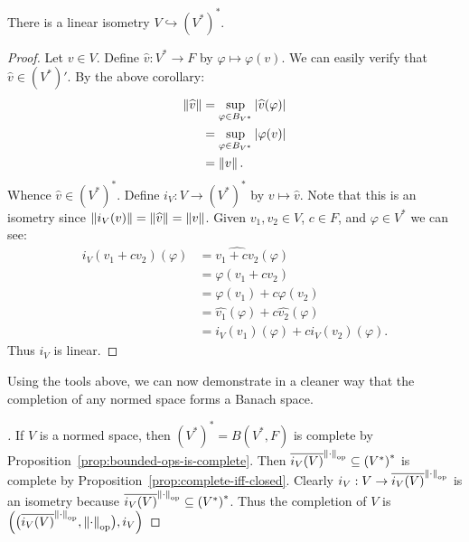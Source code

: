     \begin{corollary}
        There is a linear isometry $V \hookrightarrow \left( V^\ast \right)^\ast$.
    \end{corollary}
        \begin{proof}
            Let $v \in V$. Define $\widehat{v}:V^\ast \rightarrow F$ by $\varphi \mapsto \varphi(v)$. We can easily verify that $\widehat{v} \in (V^\ast)'$. By the above corollary:
                \begin{equation*}
                \begin{split}
                    \left\lVert \widehat{v} \right\rVert
                    & = \sup_{\varphi \in B_{V^\ast}}|\widehat{v}(\varphi)| \\
                    & = \sup_{\varphi \in B_{V^\ast}}|\varphi(v)| \\
                    & = \left\lVert v \right\rVert.
                \end{split}
                \end{equation*} 
            Whence $\widehat{v} \in \left( V^\ast \right)^\ast$. Define $i_V:V \rightarrow \left( V^\ast \right)^\ast$ by $v \mapsto \widehat{v}$. Note that this is an isometry since $\left\lVert i_V(v) \right\rVert = \left\lVert \widehat{v} \right\rVert = \left\lVert v \right\rVert$. Given $v_1,v_2 \in V$, $c \in F$, and $\varphi \in V^\ast$ we can see:
            \begin{equation*}
            \begin{split}
                i_V(v_1 + c v_2)(\varphi)
                & = \widehat{v_1 + cv_2}(\varphi) \\
                & = \varphi(v_1 + cv_2) \\
                & = \varphi(v_1) + c \varphi(v_2) \\
                & = \widehat{v_1}(\varphi) + c \widehat{v_2}(\varphi) \\
                & = i_V(v_1)(\varphi) + c i_V(v_2)(\varphi).
            \end{split}
            \end{equation*}
        Thus $i_V$ is linear.
        \end{proof}

    Using the tools above, we can now demonstrate in a cleaner way that the completion of any normed space forms a Banach space.

    \begin{proof}[]
        If $V$ is a normed space, then $\left( V^\ast \right)^\ast = B(V^\ast,F)$ is complete by Proposition~\ref{prop:bounded-ops-is-complete}. Then $\overline{i_V(V)}^{\left\lVert \cdot \right\rVert_{\operatorname{op}}} \subseteq \left( V^\ast \right)^\ast$ is complete by Proposition~\ref{prop:complete-iff-closed}. Clearly $i_V:V \rightarrow \overline{i_V(V)}^{\left\lVert \cdot \right\rVert_{\operatorname{op}}}$ is an isometry because $\overline{i_V(V)}^{\left\lVert \cdot \right\rVert_{\operatorname{op}}} \subseteq \left( V^\ast \right)^\ast$. Thus the completion of $V$ is  $\Bigl(\bigl(\overline{i_V(V)}^{\left\lVert \cdot \right\rVert_{\operatorname{op}}},\left\lVert \cdot \right\rVert_{\operatorname{op}}\bigr), i_V\Bigr)$
    \end{proof}

